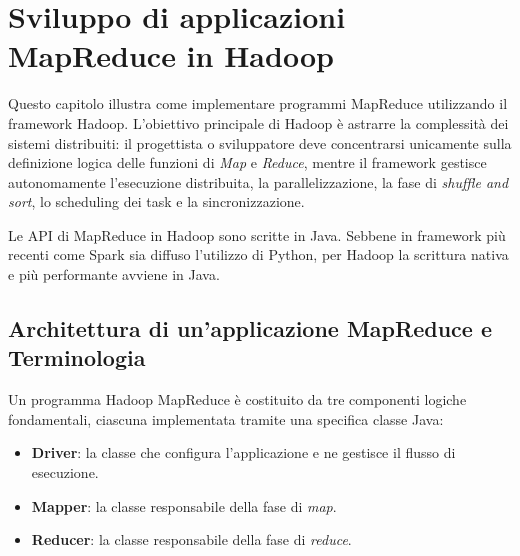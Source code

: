 \chapter{Sviluppo di applicazioni MapReduce in Hadoop}
\label{cap:hadoop-mapreduce}

Questo capitolo illustra come implementare programmi MapReduce utilizzando il framework Hadoop. L'obiettivo principale di Hadoop è astrarre la complessità dei sistemi distribuiti: il progettista o sviluppatore deve concentrarsi unicamente sulla definizione logica delle funzioni di \textit{Map} e \textit{Reduce}, mentre il framework gestisce autonomamente l'esecuzione distribuita, la parallelizzazione, la fase di \textit{shuffle and sort}, lo scheduling dei task e la sincronizzazione.

Le API di MapReduce in Hadoop sono scritte in Java. Sebbene in framework più recenti come Spark sia diffuso l'utilizzo di Python, per Hadoop la scrittura nativa e più performante avviene in Java.

\section{Architettura di un'applicazione MapReduce e Terminologia}

Un programma Hadoop MapReduce è costituito da tre componenti logiche fondamentali, ciascuna implementata tramite una specifica classe Java:
\begin{itemize}
    \item \textbf{Driver}: la classe che configura l'applicazione e ne gestisce il flusso di esecuzione.
    \item \textbf{Mapper}: la classe responsabile della fase di \textit{map}.
    \item \textbf{Reducer}: la classe responsabile della fase di \textit{reduce}.
\end{itemize}

